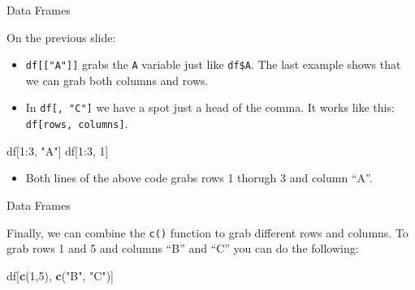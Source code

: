 \documentclass[ignorenonframetext,]{beamer}
\newenvironment{Shaded}{\begin{snugshade}}{\end{snugshade}}
\newcommand{\KeywordTok}[1]{\textcolor[rgb]{0.13,0.29,0.53}{\textbf{{#1}}}}
\newcommand{\DecValTok}[1]{\textcolor[rgb]{0.00,0.00,0.81}{{#1}}}
\newcommand{\StringTok}[1]{\textcolor[rgb]{0.31,0.60,0.02}{{#1}}}
\newcommand{\NormalTok}[1]{{#1}}
\providecommand{\tightlist}{%
\setlength{\itemsep}{0pt}\setlength{\parskip}{0pt}}
\begin{document}
\begin{frame}[fragile]{Data Frames}

On the previous slide:

\begin{itemize}[<+->]
\tightlist
\item
  \texttt{df{[}{[}"A"{]}{]}} grabs the \texttt{A} variable just like
  \texttt{df\$A}. The last example shows that we can grab both columns
  and rows.
\item
  In \texttt{df{[},\ "C"{]}} we have a spot just a head of the comma. It
  works like this: \texttt{df{[}rows,\ columns{]}}.
\end{itemize}

\begin{Shaded}
\begin{Highlighting}[]
\NormalTok{df[}\DecValTok{1}\NormalTok{:}\DecValTok{3}\NormalTok{, }\StringTok{"A"}\NormalTok{]}
\NormalTok{df[}\DecValTok{1}\NormalTok{:}\DecValTok{3}\NormalTok{, }\DecValTok{1}\NormalTok{]}
\end{Highlighting}
\end{Shaded}

\begin{itemize}[<+->]
\tightlist
\item
  Both lines of the above code grabs rows 1 thorugh 3 and column ``A''.
\end{itemize}

\end{frame}

\begin{frame}[fragile]{Data Frames}

Finally, we can combine the \texttt{c()} function to grab different rows
and columns. To grab rows 1 and 5 and columns ``B'' and ``C'' you can do
the following:

\begin{Shaded}
\begin{Highlighting}[]
\NormalTok{df[}\KeywordTok{c}\NormalTok{(}\DecValTok{1}\NormalTok{,}\DecValTok{5}\NormalTok{), }\KeywordTok{c}\NormalTok{(}\StringTok{"B"}\NormalTok{, }\StringTok{"C"}\NormalTok{)]}
\end{Highlighting}
\end{Shaded}

\end{frame}
\end{document}
